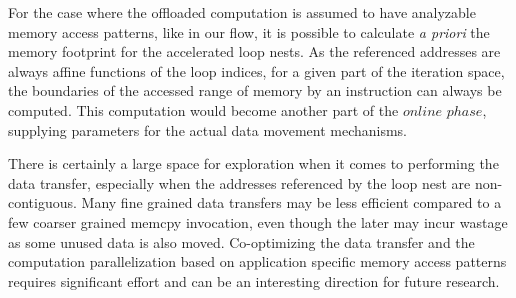 For the case where the offloaded computation is assumed to have analyzable memory access patterns, like in our flow, it is possible to calculate \textit{a priori} the  memory footprint for the accelerated loop nests. 
As the referenced addresses are always affine functions of the loop indices, for a given part of the iteration space, the boundaries of the accessed range of memory by an instruction can always be
computed. This computation would become another part of the $online$ $phase$, supplying parameters for the actual data movement mechanisms. 

There is certainly a large space for exploration when it comes to performing the data transfer, especially when the addresses referenced by the loop nest are non-contiguous. 
Many fine grained data transfers may be less efficient compared
to a few coarser grained memcpy invocation, even though the later may incur wastage as some unused data is also moved. 
Co-optimizing the data transfer and the computation parallelization based on application specific memory access patterns requires significant effort and can
be an interesting direction for future research.  




